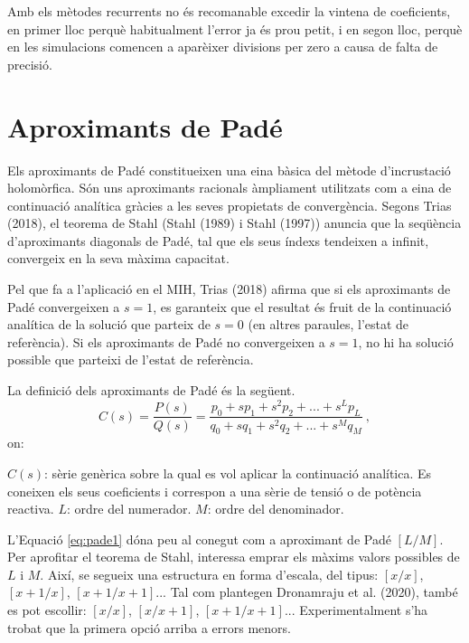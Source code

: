 Amb els mètodes recurrents no és recomanable excedir la vintena de coeficients, en primer lloc perquè habitualment l'error ja és prou petit, i en segon lloc, perquè en les simulacions comencen a aparèixer divisions per zero a causa de falta de precisió.

\section{Aproximants de Padé}
Els aproximants de Padé constitueixen una eina bàsica del mètode d'incrustació holomòrfica. Són uns aproximants racionals àmpliament utilitzats com a eina de continuació analítica gràcies a les seves propietats de convergència. Segons Trias (2018), el teorema de Stahl (Stahl (1989) i Stahl (1997)) anuncia que la seqüència d'aproximants diagonals de Padé, tal que els seus índexs tendeixen a infinit, convergeix en la seva màxima capacitat. 

Pel que fa a l'aplicació en el MIH, Trias (2018) afirma que si els aproximants de Padé convergeixen a $s=1$, es garanteix que el resultat és fruit de la continuació analítica de la solució que parteix de $s=0$ (en altres paraules, l'estat de referència). Si els aproximants de Padé no convergeixen a $s=1$, no hi ha solució possible que parteixi de l'estat de referència. 

La definició dels aproximants de Padé és la següent.
\begin{equation}
    C(s)=\frac{P(s)}{Q(s)}=\frac{p_0+sp_1+s^2p_2+...+s^Lp_L}{q_0+sq_1+s^2q_2+...+s^Mq_M}\ ,
    \label{eq:pade1}
\end{equation}
on:

$C(s)$: sèrie genèrica sobre la qual es vol aplicar la continuació analítica. Es coneixen els seus coeficients i correspon a una sèrie de tensió o de potència reactiva. 
\vs
$L$: ordre del numerador.
\vs
$M$: ordre del denominador. 

L'Equació \ref{eq:pade1} dóna peu al conegut com a aproximant de Padé $[L/M]$. Per aprofitar el teorema de Stahl, interessa emprar els màxims valors possibles de $L$ i $M$. Així, se segueix una estructura en forma d'escala, del tipus: $[x/x]$, $[x+1/x]$, $[x+1/x+1]$... Tal com plantegen Dronamraju et al. (2020), també es pot escollir: $[x/x]$, $[x/x+1]$, $[x+1/x+1]$... Experimentalment s'ha trobat que la primera opció arriba a errors menors.

